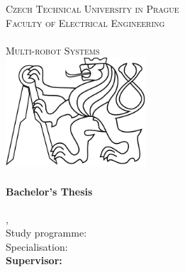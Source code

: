 
\begin{titlepage}
  \begin{center}

    \textsc{\Large Czech Technical University in Prague}\\[1em]
    \textsc{\large Faculty of Electrical Engineering\\
    \Department\\
    Multi-robot Systems\\[3em]
    }
    \includegraphics[height=4.1cm]{fig/ctu_lion.pdf}\\[3em]

    \textbf{\textsc{\Huge \Title}}\\[2em]

    \textbf{\Large Bachelor's Thesis}\\[6em]

    \textbf{\huge \Author}\\[6em]

    {\large \Location, \Date}\\[3em]

    Study programme: \Programme\\
    Specialisation: \Field\\[4em]

    \textbf{Supervisor: \Supervisor}\\

    \vspace{2pt}

  \end{center}
\end{titlepage}
